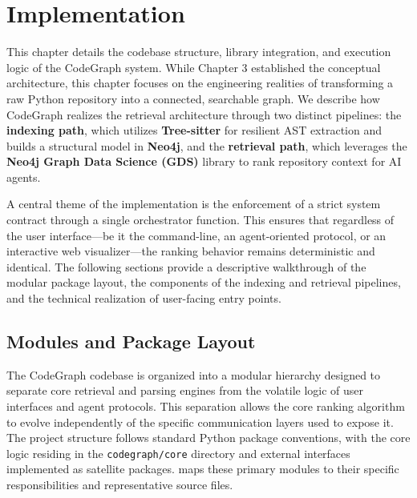 
\chapter{Implementation}
\label{ch:implementation}

This chapter details the codebase structure, library integration, and execution logic of the CodeGraph system. While Chapter 3 established the conceptual architecture, this chapter focuses on the engineering realities of transforming a raw Python repository into a connected, searchable graph. We describe how CodeGraph realizes the retrieval architecture through two distinct pipelines: the \textbf{indexing path}, which utilizes \textbf{Tree-sitter} for resilient AST extraction and builds a structural model in \textbf{Neo4j}, and the \textbf{retrieval path}, which leverages the \textbf{Neo4j Graph Data Science (GDS)} library to rank repository context for AI agents. 

A central theme of the implementation is the enforcement of a strict system contract through a single orchestrator function. This ensures that regardless of the user interface—be it the command-line, an agent-oriented protocol, or an interactive web visualizer—the ranking behavior remains deterministic and identical. The following sections provide a descriptive walkthrough of the modular package layout, the components of the indexing and retrieval pipelines, and the technical realization of user-facing entry points.

\section{Modules and Package Layout}
\label{sec:system-layout}

The CodeGraph codebase is organized into a modular hierarchy designed to separate core retrieval and parsing engines from the volatile logic of user interfaces and agent protocols. This separation allows the core ranking algorithm to evolve independently of the specific communication layers used to expose it. The project structure follows standard Python package conventions, with the core logic residing in the \texttt{codegraph/core} directory and external interfaces implemented as satellite packages.  maps these primary modules to their specific responsibilities and representative source files.

